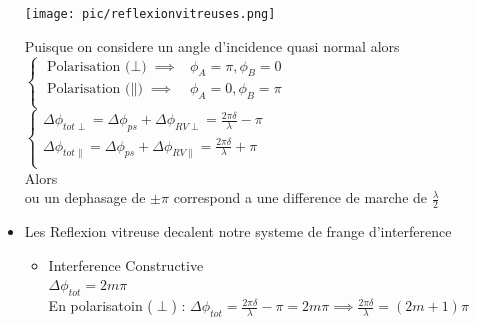\documentclass[12pt]{book}
\begin{document}
\begin{itemize}
                    \begin{center}
                        \begin{minipage}{0.3\linewidth}
                            \texttt{[image: pic/reflexionvitreuses.png]}
                        \end{minipage}
                        \begin{minipage}{0.69\linewidth}
                            Puisque on considere un angle d'incidence quasi normal alors \\
                            $\begin{cases}
                                \text{Polarisation ($\perp$)} \implies & \phi_A=\pi , \phi_B = 0 \\
                                \text{Polarisation ($\parallel$)} \implies & \phi_A=0 , \phi_B = \pi \\
                            \end{cases}$\\
                            $\begin{cases}
                                \Delta\phi_{tot\perp}=\Delta\phi_{ps} + \Delta\phi_{RV\perp} =\frac{2\pi\delta}{\lambda}-\pi \\
                                \Delta\phi_{tot\parallel}=\Delta\phi_{ps} + \Delta\phi_{RV\parallel} =\frac{2\pi\delta}{\lambda}+\pi \\
                            \end{cases}$ \\
                            Alors  \\
                            ou un dephasage de $\pm\pi$ correspond a une difference de marche de $\frac{\lambda}{2}$  
                        \end{minipage}
                    \end{center}
                \item Les Reflexion vitreuse decalent notre systeme de frange d'interference
                    \begin{itemize}
                        \item Interference Constructive\\
                            $\Delta\phi_{tot}= 2m\pi$\\
                            En polarisatoin ($ \perp $) :   $\Delta\phi_{tot}=\frac{2\pi\delta}{\lambda}-\pi=2m\pi\implies\frac{2\pi\delta}{\lambda}=(2m+1)\pi$\\

\end{itemize}
\end{itemize}
\end{document}
